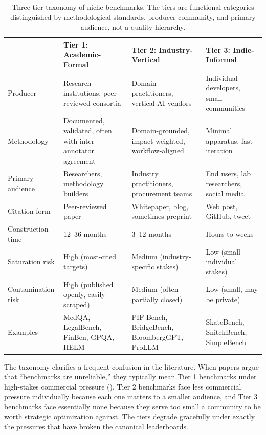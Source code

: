 \documentclass[11pt,a4paper]{article}
\begin{document}
\begin{table}[h]
\centering
\caption{Three-tier taxonomy of niche benchmarks. The tiers are functional categories distinguished by methodological standards, producer community, and primary audience, not a quality hierarchy.}
\label{tab:tiers}
\small
\begin{tabular}{@{}lp{3.5cm}p{3.5cm}p{3.5cm}@{}}
\toprule
 & \textbf{Tier 1: Academic-Formal} & \textbf{Tier 2: Industry-Vertical} & \textbf{Tier 3: Indie-Informal} \\
\midrule
Producer       & Research institutions, peer-reviewed consortia & Domain practitioners, vertical AI vendors & Individual developers, small communities \\
Methodology    & Documented, validated, often with inter-annotator agreement & Domain-grounded, impact-weighted, workflow-aligned & Minimal apparatus, fast-iteration \\
Primary audience & Researchers, methodology builders & Industry practitioners, procurement teams & End users, lab researchers, social media \\
Citation form  & Peer-reviewed paper & Whitepaper, blog, sometimes preprint & Web post, GitHub, tweet \\
Construction time & 12--36 months & 3--12 months & Hours to weeks \\
Saturation risk & High (most-cited targets) & Medium (industry-specific stakes) & Low (small individual stakes) \\
Contamination risk & High (published openly, easily scraped) & Medium (often partially closed) & Low (small, may be private) \\
Examples       & MedQA, LegalBench, FinBen, GPQA, HELM & PIF-Bench, BridgeBench, BloombergGPT, ProLLM & SkateBench, SnitchBench, SimpleBench \\
\bottomrule
\end{tabular}
\end{table}

The taxonomy clarifies a frequent confusion in the literature. When papers argue that ``benchmarks are unreliable,'' they typically mean Tier 1 benchmarks under high-stakes commercial pressure (). Tier 2 benchmarks face less commercial pressure individually because each one matters to a smaller audience, and Tier 3 benchmarks face essentially none because they serve too small a community to be worth strategic optimization against. The tiers degrade gracefully under exactly the pressures that have broken the canonical leaderboards.
\end{document}
